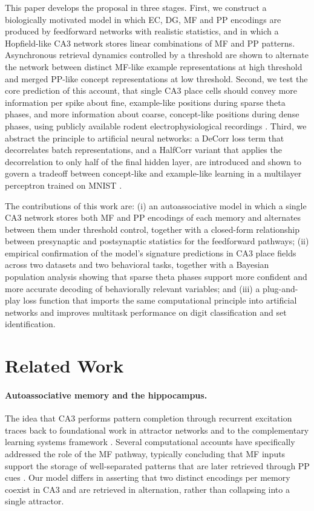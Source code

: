 This paper develops the proposal in three stages. First, we construct a biologically motivated model in which EC, DG, MF and PP encodings are produced by feedforward networks with realistic statistics, and in which a Hopfield-like CA3 network \cite{hopfield1982neural,tsodyks1988enhanced} stores linear combinations of MF and PP patterns. Asynchronous retrieval dynamics controlled by a threshold \cite{amit1985spin} are shown to alternate the network between distinct MF-like example representations at high threshold and merged PP-like concept representations at low threshold. Second, we test the core prediction of this account, that single CA3 place cells should convey more information per spike about fine, example-like positions during sparse theta phases, and more information about coarse, concept-like positions during dense phases, using publicly available rodent electrophysiological recordings \cite{mizuseki2013hc3,karlsson2015hc6}. Third, we abstract the principle to artificial neural networks: a DeCorr loss term that decorrelates batch representations, and a HalfCorr variant that applies the decorrelation to only half of the final hidden layer, are introduced and shown to govern a tradeoff between concept-like and example-like learning in a multilayer perceptron trained on MNIST \cite{lecun1998gradient}.

The contributions of this work are: (i) an autoassociative model in which a single CA3 network stores both MF and PP encodings of each memory and alternates between them under threshold control, together with a closed-form relationship between presynaptic and postsynaptic statistics for the feedforward pathways; (ii) empirical confirmation of the model's signature predictions in CA3 place fields across two datasets and two behavioral tasks, together with a Bayesian population analysis showing that sparse theta phases support more confident and more accurate decoding of behaviorally relevant variables; and (iii) a plug-and-play loss function that imports the same computational principle into artificial networks and improves multitask performance on digit classification and set identification.

\section{Related Work}

\paragraph{Autoassociative memory and the hippocampus.} The idea that CA3 performs pattern completion through recurrent excitation traces back to foundational work in attractor networks \cite{hopfield1982neural,tsodyks1988enhanced,amit1985spin} and to the complementary learning systems framework \cite{mcnaughton1987hippocampal,mcclelland1995why}. Several computational accounts have specifically addressed the role of the MF pathway, typically concluding that MF inputs support the storage of well-separated patterns that are later retrieved through PP cues \cite{treves1992computational}. Our model differs in asserting that two distinct encodings per memory coexist in CA3 and are retrieved in alternation, rather than collapsing into a single attractor.

